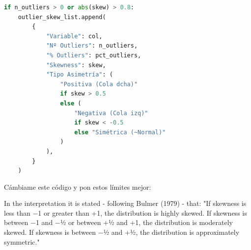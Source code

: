 \documentclass[12pt,a4paper,oneside]{book}
\begin{document}
\begin{iaprompt}
\begin{lstlisting}[language=Python]
if n_outliers > 0 or abs(skew) > 0.8:
    outlier_skew_list.append(
        {
            "Variable": col,
            "Nº Outliers": n_outliers,
            "% Outliers": pct_outliers,
            "Skewness": skew,
            "Tipo Asimetría": (
                "Positiva (Cola dcha)"
                if skew > 0.5
                else (
                    "Negativa (Cola izq)"
                    if skew < -0.5
                    else "Simétrica (~Normal)"
                )
            ),
        }
    )
\end{lstlisting}
Cámbiame este código y pon estos límites mejor:

In the interpretation it is stated - following Bulmer (1979) - that: "If skewness is less than −1 or greater than +1, the distribution is highly skewed. If skewness is between −1 and −½ or between +½ and +1, the distribution is moderately skewed. If skewness is between −½ and +½, the distribution is approximately symmetric."
\end{iaprompt}
\end{document}
